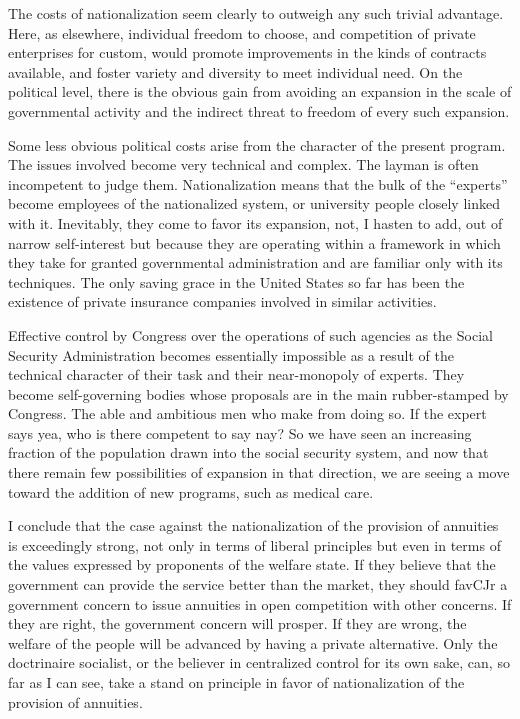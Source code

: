 \documentclass[11pt,openany]{book}
\begin{document}
The costs of nationalization seem clearly to outweigh any such trivial advantage. Here, as elsewhere, individual freedom to choose, and competition of private enterprises for custom, would promote improvements in the kinds of contracts available, and foster variety and diversity to meet individual need. On the political level, there is the obvious gain from avoiding an expansion in the scale of governmental activity and the indirect threat to freedom of every such expansion.

Some less obvious political costs arise from the character of the present program. The issues involved become very technical and complex. The layman is often incompetent to judge them. Nationalization means that the bulk of the ``experts'' become employees of the nationalized system, or university people closely linked with it. Inevitably, they come to favor its expansion, not, I hasten to add, out of narrow self-interest but because they are operating within a framework in which they take for granted governmental administration and are familiar only with its techniques. The only saving grace in the United States so far has been the existence of private insurance companies involved in similar activities.

Effective control by Congress over the operations of such agencies as the Social Security Administration becomes essentially impossible as a result of the technical character of their task and their near-monopoly of experts. They become self-governing bodies whose proposals are in the main rubber-stamped by Congress. The able and ambitious men who make from doing so. If the expert says yea, who is there competent to say nay? So we have seen an increasing fraction of the population drawn into the social security system, and now that there remain few possibilities of expansion in that direction, we are seeing a move toward the addition of new programs, such as medical care.

I conclude that the case against the nationalization of the provision of annuities is exceedingly strong, not only in terms of liberal principles but even in terms of the values expressed by proponents of the welfare state. If they believe that the government can provide the service better than the market, they should favCJr a government concern to issue annuities in open competition with other concerns. If they are right, the government concern will prosper. If they are wrong, the welfare of the people will be advanced by having a private alternative. Only the doctrinaire socialist, or the believer in centralized control for its own sake, can, so far as I can see, take a stand on principle in favor of nationalization of the provision of annuities.
\end{document}
